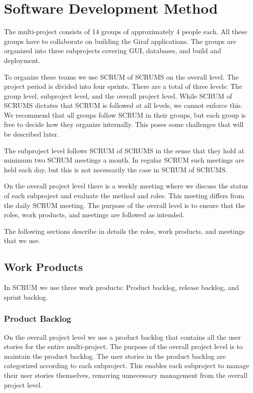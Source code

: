 \chapter{Software Development Method}%
The multi-project consists of 14 groups of approximately 4 people each. All these groups have to collaborate on building the Giraf applications. The groups are organized into three subprojects covering GUI, databases, and build and deployment.

To organize these teams we use SCRUM of SCRUMS on the overall level. The project period is divided into four sprints. There are a total of three levels: The group level, subproject level, and the overall project level. While SCRUM of SCRUMS dictates that SCRUM is followed at all levels, we cannot enforce this. We recommend that all groups follow SCRUM in their groups, but each group is free to decide how they organize internally. This poses some challenges that will be described later.

The subproject level follows SCRUM of SCRUMS in the sense that they hold at minimum two SCRUM meetings a month. In regular SCRUM such meetings are held each day, but this is not necessarily the case in SCRUM of SCRUMS.

On the overall project level there is a weekly meeting where we discuss the status of each subproject and evaluate the method and roles. This meeting differs from the daily SCRUM meeting. The purpose of the overall level is to ensure that the roles, work products, and meetings are followed as intended.

The following sections describe in details the roles, work products, and meetings that we use.

\section{Work Products}
In SCRUM we use three work products: Product backlog, release backlog, and sprint backlog.

\subsection{Product Backlog}
On the overall project level we use a product backlog that contains all the user stories for the entire multi-project. The purpose of the overall project level is to maintain the product backlog. The user stories in the product backlog are categorized according to each subproject. This enables each subproject to manage their user stories themselves, removing unnecessary management from the overall project level.

